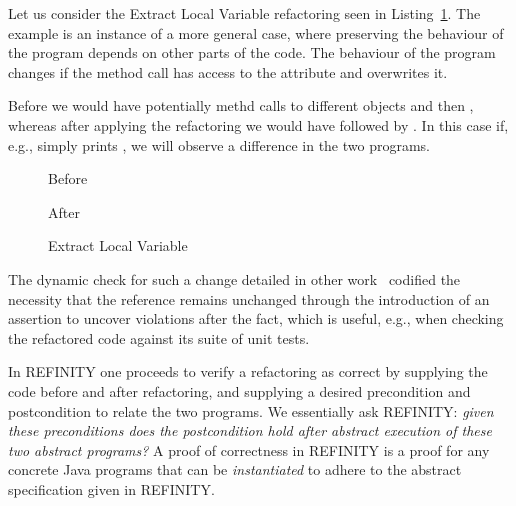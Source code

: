Let us consider the Extract Local Variable refactoring seen in Listing~\ref{lst:ExtractVariable-java}.
The example is an instance of a more general case, where preserving the behaviour of the program depends on other parts of the code.
The behaviour of the program changes if the method call  has access to the attribute  and overwrites it.

Before we would have potentially methd calls to different objects  and then , whereas after applying the refactoring we would
have  followed by .
In this case if, e.g.,  simply prints , we will observe a difference in the two programs.

\begin{figure}[tbp]
  \captionsetup{type=lstlisting}
  \centering
  \begin{sublstlisting}{.2\linewidth}
    
    \caption{Before}
  \end{sublstlisting}\hspace{1cm}
  \begin{sublstlisting}{.3\linewidth}
    
    \caption{After}
  \end{sublstlisting}
  \caption{Extract Local Variable}
  \label{lst:ExtractVariable-java}
\end{figure}

The dynamic check for such a change detailed in other work~\cite{stolz:isolarefa} codified the necessity that the reference 
remains unchanged through the introduction of an assertion  to uncover violations after the fact,
which is useful, e.g., when checking the refactored code against its suite of unit tests.

In REFINITY one proceeds to verify a refactoring as correct by supplying the code before and after refactoring, and supplying a desired precondition and postcondition to relate the two programs.
We essentially ask REFINITY: \emph{given these preconditions does the postcondition hold after abstract execution of these two abstract programs?}
A proof of correctness in REFINITY is a proof for any concrete Java programs that can be \emph{instantiated} to adhere to the abstract specification given in REFINITY.

